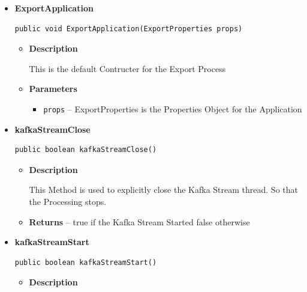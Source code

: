 {{{{{{{{{{{{{{{{{{\begin{itemize}
{\begin{itemize}
{This Methode definite the Process of the Application. What Application does specificly.
}
\item{{\bf  Returns} -- 
true if the Export Process got Successfully worked. 
}%
\end{itemize}
}%
\item{ 
\hypertarget{Controller.ExportProcessStrategy.ExportApplication(ExportProperties)}{{\bf  ExportApplication}\\}
\begin{lstlisting}[frame=none]
public void ExportApplication(ExportProperties props)\end{lstlisting} %
\begin{itemize}
\item{
{\bf  Description}

This is the default Contructer for the Export Process
}
\item{
{\bf  Parameters}
  \begin{itemize}
   \item{
\texttt{props} -- ExportProperties is the Properties Object for the Application}
  \end{itemize}
}%
\end{itemize}
}%
\item{ 
\hypertarget{Controller.ExportProcessStrategy.kafkaStreamClose()}{{\bf  kafkaStreamClose}\\}
\begin{lstlisting}[frame=none]
public boolean kafkaStreamClose()\end{lstlisting} %
\begin{itemize}
\item{
{\bf  Description}

This Method is used to explicitly close the Kafka Stream thread. So that the Processing stops.
}
\item{{\bf  Returns} -- 
true if the Kafka Stream Started false otherwise 
}%
\end{itemize}
}%
\item{ 
\hypertarget{Controller.ExportProcessStrategy.kafkaStreamStart()}{{\bf  kafkaStreamStart}\\}
\begin{lstlisting}[frame=none]
public boolean kafkaStreamStart()\end{lstlisting} %
\begin{itemize}
\item{
{\bf  Description}

}
\end{itemize}}
\end{itemize}}}}}}}}}}}}}}}}}}}
